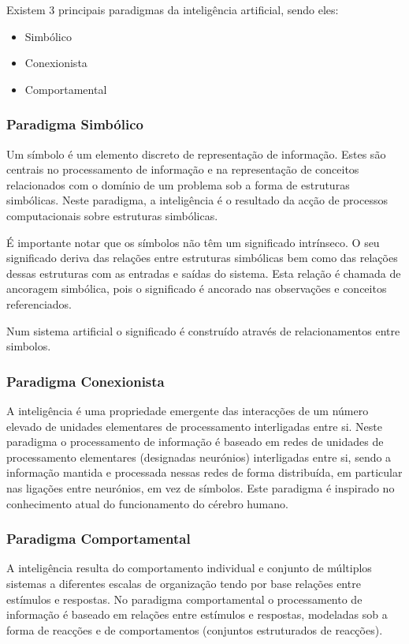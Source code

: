 \documentclass[a4paper,12pt]{article}
\begin{document}
Existem 3 principais paradigmas da inteligência artificial, sendo eles:
\begin{itemize}
	\item Simbólico
	\item Conexionista
	\item Comportamental
\end{itemize}

\subsubsection{Paradigma Simbólico}
Um símbolo é um elemento discreto de representação de informação. Estes são centrais no processamento de informação e na representação de conceitos relacionados com o domínio de um problema sob a forma de estruturas simbólicas.
Neste paradigma, a inteligência é o resultado da acção de processos computacionais sobre estruturas simbólicas.

É importante notar que os símbolos não têm um significado intrínseco. O seu significado deriva das relações entre estruturas simbólicas bem como das relações dessas estruturas com as entradas e saídas do sistema. Esta relação é chamada de ancoragem simbólica, pois o significado é ancorado nas observações e conceitos referenciados.

Num sistema artificial o significado é construído através de relacionamentos entre simbolos.

\subsubsection{Paradigma Conexionista}
A inteligência é uma propriedade emergente das interacções de um número elevado de unidades elementares de processamento interligadas entre si.
Neste paradigma o processamento de informação é baseado em redes de unidades de processamento elementares (designadas neurónios) interligadas entre si, sendo a informação mantida e processada nessas redes de forma distribuída, em particular nas ligações entre neurónios, em vez de símbolos. Este paradigma é inspirado no conhecimento atual do funcionamento do cérebro humano.

\subsubsection{Paradigma Comportamental}
A inteligência resulta do comportamento individual e conjunto de múltiplos sistemas a diferentes escalas de organização tendo por base relações entre estímulos e respostas.
No paradigma comportamental o processamento de informação é baseado em relações entre estímulos e respostas, modeladas sob a forma de reacções e de comportamentos (conjuntos estruturados de reacções).
\end{document}
